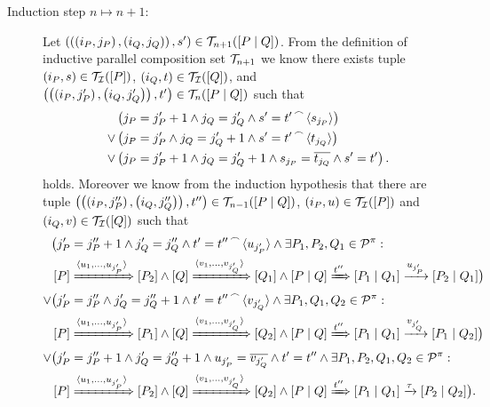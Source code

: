 \begin{prf}
\begin{description}
\item[Induction step $n\mapsto n+1$:] Let $\left(\left(\left(i_P,j_P\right),\left(i_Q,j_Q\right)\right),s'\right)\in\mathcal T_{n+1}(\left[P \mid Q\right])$. From the definition of inductive parallel composition set $\traces_{n+1}$ we know there exists tuple $\left(i_P,s\right)\in\mathcal{T_I}(\left[P\right])$, $\left(i_Q,t\right)\in\mathcal{T_I}(\left[Q\right])$, and $\left(\left(\left(i_P,j_P'\right),\left(i_Q,j_Q'\right)\right),t'\right)\in\mathcal T_{n}(\left[P \mid Q\right])$ such that \begin{equation}
\label{eq_constraint}
	\begin{split}
		&\left(j_P=j_P'+1\wedge j_Q=j_Q'\wedge s'={t'}^{\,\frown{}\,}{\langle s_{j_P}\rangle}\right) \\
		\vee&\left(j_P=j_P'\wedge j_Q=j_Q'+1\wedge s'={t'}^{\,\frown{}\,}{\langle t_{j_Q}\rangle}\right)\\
		\vee&\left(j_P=j_P'+1\wedge j_Q=j_Q'+1\wedge s_{j_P}=\overline{t_{j_Q}}\wedge s'=t'\right).
	\end{split}
\end{equation}
holds. Moreover we know from the induction hypothesis that there are tuple $\left(\left(\left(i_P,j_P''\right),\left(i_Q,j_Q''\right)\right),t''\right)\in\mathcal T_{n-1}(\left[P \mid Q\right])$, $\left(i_P,u\right)\in\mathcal{T_I}(\left[P\right])$ and $\left(i_Q,v\right)\in\mathcal{T_I}(\left[Q\right])$ such that
\begin{align*}
	&\bigl(j_P'=j_P''+1\wedge j_Q'=j_Q''\wedge t'={t''}^{\,\frown{}\,}{\langle u_{j_P'}\rangle}\wedge\exists{}P_1,P_2,Q_1\in\mathcal P^{\pi}:\\
&\left[P\right]\xRightarrow{\langle u_1,\ldots,u_{j_P'}\rangle}\left[P_2\right]\wedge\left[Q\right]\xRightarrow{\langle v_1,\ldots,v_{j_Q'}\rangle}\left[Q_1\right]\wedge\left[P \mid Q\right]\xRightarrow{t''}\left[P_1 \mid Q_1\right]\xrightarrow{u_{j_P'}}\left[P_2 \mid Q_1\right]\bigr) \\
	\vee&  \bigl(j_P'=j_P''\wedge j_Q'=j_Q''+1\wedge t'={t''}^{\,\frown{}\,}{\langle v_{j_Q'}\rangle}\wedge\exists{}P_1,Q_1,Q_2\in\mathcal P^{\pi}: \\
&\left[P\right]\xRightarrow{\langle u_1,\ldots,u_{j_P'}\rangle}\left[P_1\right]\wedge\left[Q\right]\xRightarrow{\langle v_1,\ldots,v_{j_Q'}\rangle}\left[Q_2\right]\wedge\left[P \mid Q\right]\xRightarrow{t''}\left[P_1 \mid Q_1\right]\xrightarrow{v_{j_Q'}}\left[P_1 \mid Q_2\right]  \bigr) \\
	\vee&  \bigl(j_P'=j_P''+1\wedge j_Q'=j_Q''+1\wedge u_{j_P'}=\overline{v_{j_Q'}}\wedge t'=t''\wedge\exists{}P_1,P_2,Q_1,Q_2\in\mathcal P^{\pi}:\\
&\left[P\right]\xRightarrow{\langle u_1,\ldots,u_{j_P'}\rangle}\left[P_2\right]\wedge \left[Q\right]\xRightarrow{\langle v_1,\ldots,v_{j_Q'}\rangle}\left[Q_2\right]\wedge  \left[P \mid Q\right]\xRightarrow{t''}\left[P_1 \mid Q_1\right]\xrightarrow{\tau}\left[P_2 \mid Q_2\right]\bigr).
\end{align*}

\end{description}
\end{prf}

